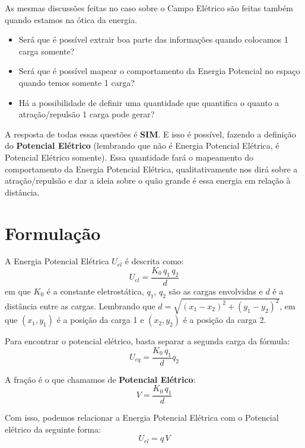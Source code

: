 \documentclass[12pt]{extarticle}
\newcommand{\<}{\langle}
\renewcommand{\>}{\rangle}
\theoremstyle{definition}
\begin{document}
As mesmas discussões feitas no caso sobre o Campo Elétrico são feitas também quando estamos na ótica da energia.
\begin{itemize}
    \item Será que é possível extrair boa parte das informações quando colocamos 1 carga somente?
    \item Será que é possível mapear o comportamento da Energia Potencial no espaço quando temos somente 1 carga?
    \item Há a possibilidade de definir uma quantidade que quantifica o quanto a atração/repulsão 1 carga pode gerar?
\end{itemize}

A resposta de todas essas questões é \textbf{SIM}. E isso é possível, fazendo a definição do \textbf{Potencial Elétrico} (lembrando que não é Energia Potencial Elétrica, é Potencial Elétrico somente). Essa quantidade fará o mapeamento do comportamento da Energia Potencial Elétrica, qualitativamente nos dirá sobre a atração/repulsão e dar a ideia sobre o quão grande é essa energia em relação à distância.

\section{Formulação}

A Energia Potencial Elétrica $U_{el}$ é descrita como:
\begin{equation}
    \boxed{U_{el} = \frac{K_0\,q_1\,q_2}{d}}
\end{equation}
\noindent em que $K_0$ é a constante eletrostática, $q_1,\,q_2$ são as cargas envolvidas e $d$ é a distância entre as cargas. Lembrando que $d= \sqrt{(x_1-x_2)^2+(y_1-y_2)^2}$, em que $(x_1,y_1)$ é a posição da carga 1 e $(x_2,y_2)$ é a posição da carga 2.

Para encontrar o potencial elétrico, basta separar a segunda carga da fórmula:
\begin{equation}
    U_{eq} = \frac{K_0\,q_1}{d}q_2
\end{equation}

A fração é o que chamamos de \textbf{Potencial Elétrico}:
\begin{equation}
    \boxed{V = \frac{K_0\,q_1}{d}}
\end{equation}

Com isso, podemos relacionar a Energia Potencial Elétrica com o Potencial elétrico da seguinte forma:
\begin{equation}\label{eq:4}
    \boxed{U_{el}=q\,V}
\end{equation}
\end{document}
